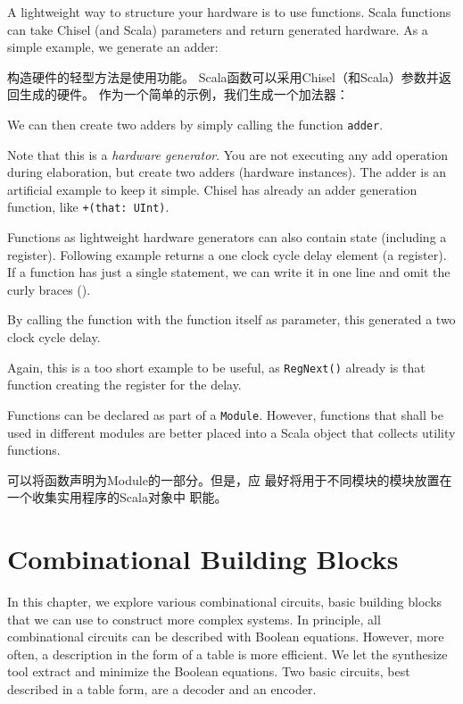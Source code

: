 \documentclass[%
    10pt,
    headinclude, footexclude,
    openright, %
    notitlepage,
    cleardoubleempty,
    headsepline,
    pointlessnumbers,
    bibtotoc, idxtotoc,
    ]{scrbook}
\newcommand{\code}[1]{{\small{\texttt{#1}}}}
\begin{document}
A lightweight way to structure your hardware is to use functions.
Scala functions can take Chisel (and Scala) parameters and return generated hardware.
As a simple example, we generate an adder:

构造硬件的轻型方法是使用功能。
Scala函数可以采用Chisel（和Scala）参数并返回生成的硬件。
作为一个简单的示例，我们生成一个加法器：


\noindent We can then create two adders by simply calling the function \code{adder}.


\noindent Note that this is a \emph{hardware generator}. You are not executing any add operation
during elaboration, but create two adders (hardware instances). The adder is an artificial example
to keep it simple. Chisel has already an adder generation function, like \code{+(that: UInt)}.

Functions as lightweight hardware generators can also contain state (including a register).
Following example returns a one clock cycle delay element (a register).
If a function has just a single statement, we can write it in one line and omit the curly
braces ({}).


\noindent By calling the function with the function itself as parameter, this generated a two
clock cycle delay.


\noindent Again, this is a too short example to be useful, as \code{RegNext()}
already is that function creating the register for the delay.

Functions can be declared as part of a \code{Module}. However, functions that shall be
used in different modules are better placed into a Scala object that collects utility
functions.

可以将函数声明为Module的一部分。但是，应
最好将用于不同模块的模块放置在一个收集实用程序的Scala对象中
职能。

\chapter{Combinational Building Blocks}

In this chapter, we explore various combinational circuits, basic building blocks that we can
use to construct more complex systems.
In principle, all combinational circuits can be described with Boolean equations.
However, more often, a description in the form of a table is more efficient.
We let the synthesize tool extract and minimize the Boolean equations.
Two basic circuits, best described in a table form, are a decoder and an encoder.
\end{document}
